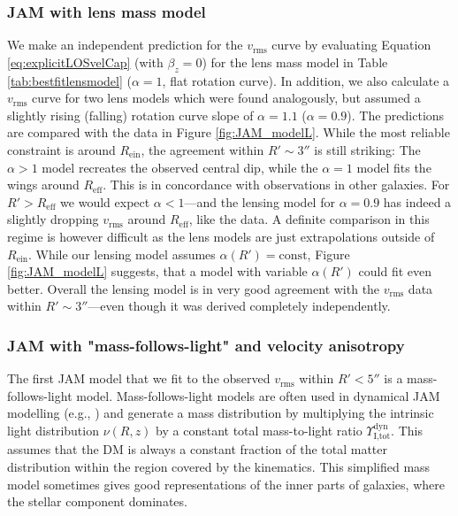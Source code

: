 \documentclass[useAMS,usenatbib]{mnras}
\begin{document}
\subsubsection{JAM with lens mass model}

We make an independent prediction for the $v_\text{rms}$ curve by evaluating Equation \ref{eq:explicitLOSvelCap} (with $\beta_z = 0$) for the lens mass model in Table \ref{tab:bestfitlensmodel} ($\alpha = 1$, flat rotation curve). In addition, we also calculate a  $v_\text{rms}$ curve for two lens models which were found analogously, but assumed a slightly rising (falling) rotation curve slope of $\alpha=1.1$ ($\alpha=0.9$). The predictions are compared with the data in Figure \ref{fig:JAM_modelL}. While the most reliable constraint is around $R_\text{ein}$, the agreement within $R' \sim 3''$ is still striking: The $\alpha > 1$ model recreates the observed central dip, while the $\alpha = 1$ model fits the wings around $R_\text{eff}$. This is in concordance with observations in other galaxies. For $R'> R_\text{eff}$ we would expect $\alpha<1$---and the lensing model for $\alpha=0.9$ has indeed a slightly dropping $v_\text{rms}$ around $R_\text{eff}$, like the data. A definite comparison in this regime is however difficult as the lens models are just extrapolations outside of $R_\text{ein}$. While our lensing model assumes $\alpha(R')=\text{const}$, Figure \ref{fig:JAM_modelL} suggests, that a model with variable $\alpha(R')$ could fit even better. Overall the lensing model is in very good agreement with the $v_\text{rms}$ data within $R' \sim 3''$---even though it was derived completely independently.

\subsubsection{JAM with "mass-follows-light" and velocity anisotropy} \label{sec:results_JAM_SB_MfL}

The first JAM model that we fit to the observed $v_\text{rms}$ within $R'<5''$ is a mass-follows-light model. Mass-follows-light models are often used in dynamical JAM modelling (e.g., \citealt{GlennEC,Cap06}) and generate a mass distribution by multiplying the intrinsic light distribution $\nu(R,z)$ by a constant total mass-to-light ratio  $\Upsilon_\text{I,tot}^\text{dyn}$. This assumes that the DM is always a constant fraction of the total matter distribution within the region covered by the kinematics. This simplified mass model sometimes gives good representations of the inner parts of galaxies, where the stellar component dominates.
\end{document}
